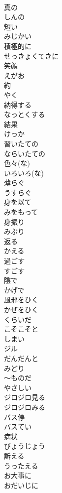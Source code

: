 \documentclass[8pt]{extreport}
\begin{document}
\begin{CJK}{UTF8}{min}
\\	真の	
\\	しんの
\\	短い	
\\	みじかい
\\	積極的に	
\\	せっきょくてきに
\\	笑顔	
\\	えがお
\\	約	
\\	やく
\\	納得する	
\\	なっとくする
\\	結果	
\\	けっか
\\	習いたての	
\\	ならいたての
\\	色々(な)	
\\	いろいろ(な)
\\	薄らぐ	
\\	うすらぐ
\\	身を以て	
\\	みをもって
\\	身振り	
\\	みぶり
\\	返る	
\\	かえる
\\	過ごす	
\\	すごす
\\	陰で	
\\	かげで
\\	風邪をひく	
\\	かぜをひく
\\	くらいだ	
\\	こそこそと	
\\	しまい	
\\	ジル	
\\	だんだんと	
\\	みどり	
\\	～ものだ	
\\	やさしい	
\\	ジロジロ見る	
\\	ジロジロみる
\\	バス停	
\\	バスてい
\\	病状	
\\	びょうじょう
\\	訴える	
\\	うったえる
\\	お大事に	
\\	おだいじに

\end{CJK}
\end{document}
